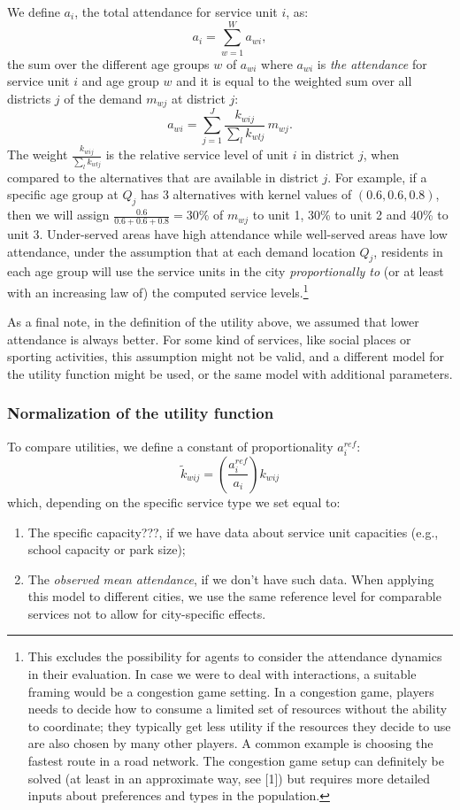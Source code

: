 \documentclass{article}
\begin{document}
We define $a_i$, the total attendance for service unit $i$, as: 
\[a_i=\sum_{w=1}^W a_{wi},\] 
the sum over the different age groups $w$ of $a_{wi}$ where $a_{wi}$ is \textit{the attendance} for service unit $i$ and age group $w$ and it is equal to the weighted sum over all districts $j$ of the demand $m_{wj}$ at district $j$:
    \[a_{wi}=\sum_{j=1}^J{\frac{k_{wij}}{\sum_l{k_{wlj}}} \, m_{wj}}.\]
    The weight $\frac{k_{wij}}{\sum_l{k_{wlj}}}$ is the relative service level of unit $i$ in district $j$, when compared to the alternatives that are available in district $j$. For example, if a specific age group at $Q_j$ has 3 alternatives with kernel values of $(0.6, 0.6, 0.8)$, then we will assign $\frac{0.6}{0.6+0.6+0.8}=30\%$ of $m_{wj}$ to unit 1, 30\% to unit 2 and 40\% to unit 3.
 Under-served areas have high attendance while well-served areas have low attendance, under the assumption that at each demand location $Q_j$, residents in each age group will use the service units in the city \textit{proportionally to} (or at least with an increasing law of) the computed service levels.\footnote{This excludes the possibility for agents to consider the attendance dynamics in their evaluation. In case we were to deal with interactions, a suitable framing would be a congestion game setting. In a congestion game, players needs to decide how to consume a limited set of resources without the ability to coordinate; they typically get less utility if the resources they decide to use are also chosen by many other players. A common example is choosing the fastest route in a road network.
The congestion game setup can definitely be solved (at least in an approximate way, see [1]) but requires more detailed inputs about preferences and types in the population.}
 
 As a final note, in the definition of the utility above, we assumed that lower attendance is always better. For some kind of services, like social places or sporting activities, this assumption might not be valid,
and a different model for the utility function might be used, or the same model with additional parameters.

    
\subsubsection{Normalization of the utility function}

To compare utilities, we define a constant of proportionality $a_i^{ref}$:
 \[\widetilde{k}_{wij} = \left(\frac{a_i^{ref}}{a_i}\right)k_{wij}\]
which, depending on the specific service type we set equal to:
\begin{enumerate}
    \item The specific capacity???, if we have data about service unit capacities (e.g., school capacity or park size);
    \item The \textit{observed mean attendance}, if we don't have such data. When applying this model to different cities, we use the same reference level for comparable services not to allow for city-specific effects.
\end{enumerate}
\end{document}
